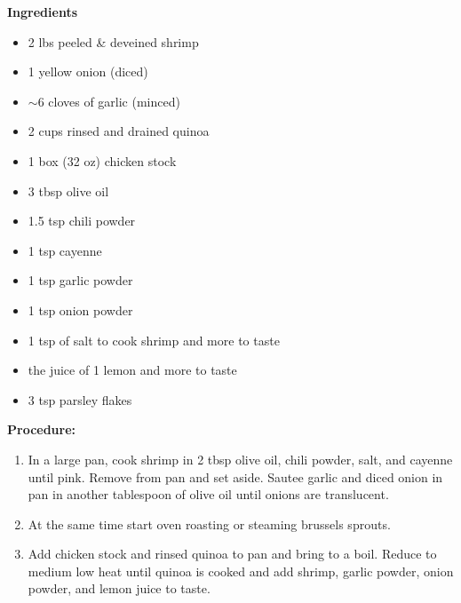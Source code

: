 \begin{multicols}{2}
\textbf{Ingredients}
\begin{itemize}
\item 2 lbs peeled \& deveined shrimp 
\item 1 yellow onion (diced)
\item $\sim 6$ cloves of garlic (minced)
\item 2 cups rinsed and drained quinoa
\item 1 box (32 oz) chicken stock
\item 3 tbsp olive oil  
\item 1.5 tsp chili powder
\item 1 tsp cayenne 
\item 1 tsp garlic powder
\item 1 tsp onion powder 
\item 1 tsp of salt to cook shrimp and more to taste
\item the juice of 1 lemon and more to taste 
\item 3 tsp parsley flakes 





\end{itemize}


\columnbreak
\textbf{Procedure:}
\medskip


\begin{enumerate}
\item In a large pan, cook shrimp in 2 tbsp olive oil, chili powder, salt, and cayenne until pink. Remove from pan and set aside. Sautee garlic and diced onion in pan in another tablespoon of olive oil until onions are translucent. 

\medskip

\item At the same time start oven roasting or steaming brussels sprouts. 

\medskip

\item Add chicken stock and rinsed quinoa to pan and bring to a boil. Reduce to medium low heat until quinoa is cooked and add shrimp, garlic powder, onion powder, and lemon juice to taste. 



 
\end{enumerate}

\end{multicols}



